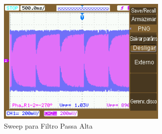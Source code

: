 \documentclass{article}
\begin{document}
\begin{figure}[h!]
\centering
\includegraphics[height=6.2cm]{images/NewFile27.png}
\caption{Sweep para Filtro Passa Alta}
\label{fig:sweep_alta}
\end{figure}
\end{document}
